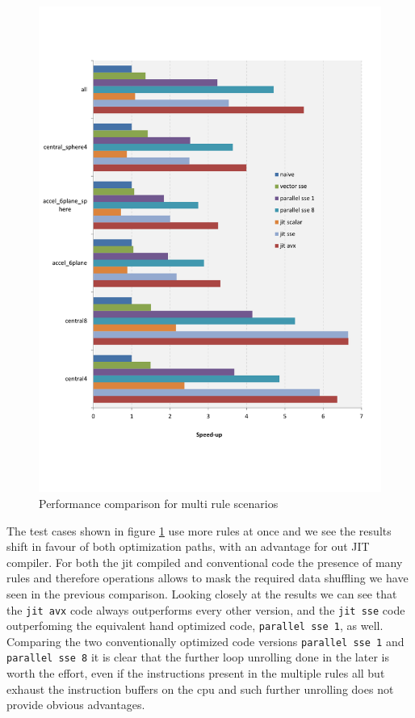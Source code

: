 \begin{figure}\centering
  \includegraphics[scale=0.6]{multi_rules.pdf}
  \caption{Performance comparison for multi rule scenarios
  \label{perf_multi}}
\end{figure}

The test cases shown in figure \ref{perf_multi} use more rules at once and we see the results shift in favour of both optimization paths, with an advantage for out JIT compiler. For both the jit compiled and conventional code the presence of many rules and therefore operations allows to mask the required data shuffling we have seen in the previous comparison. Looking closely at the results we can see that the \texttt{jit avx} code always outperforms every other version, and the \texttt{jit sse} code outperfoming the equivalent hand optimized code, \texttt{parallel sse 1}, as well. Comparing the two conventionally optimized code versions \texttt{parallel sse 1} and \texttt{parallel sse 8} it is clear that the further loop unrolling done in the later is worth the effort, even if the instructions present in the multiple rules all but exhaust the instruction buffers on the cpu and such further unrolling does not provide obvious advantages.

